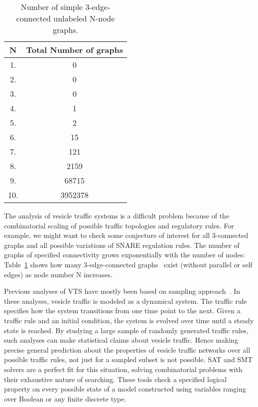 \begin{table}[!ht]
	\centering
	\begin{tabular}{|c|c|}
		\hline 
		\textbf{N} & \textbf{Total Number of graphs} \\ \hline
		1.         & 0                               \\ \hline
		2.         & 0                               \\ \hline
		3.         & 0                               \\ \hline
		4.         & 1                               \\ \hline
		5.         & 2                               \\ \hline
		6.         & 15                              \\ \hline
		7.         & 121                             \\ \hline
		8.         & 2159                            \\ \hline
		9.         & 68715                           \\ \hline
		10.        & 3952378                         \\ \hline
	\end{tabular}
	\label{tab-graphs}
     \caption{Number of simple 3-edge-connected unlabeled N-node graphs.}
\end{table}

The analysis of vesicle traffic systems is a difficult problem
because of the combinatorial scaling of possible traffic topologies and regulatory rules. 
%
For example, we might want to check some conjecture of interest for all 3-connected graphs and
all possible variations of SNARE regulation rules. 
%
The number of graphs of specified connectivity grows exponentially with the number of nodes: Table~\ref{tab-graphs} shows how many 3-edge-connected graphs~\cite{a052448-oeis} exist (without parallel or self edges) as node number N increases.
%

Previous analyses of VTS have mostly been based on sampling approach~\cite{mani2016wine, mani2016stacking}. 
%
In these analyses, vesicle traffic is
modeled as a dynamical system. 
%
The traffic rule specifies how the system transitions from one
time point to the next. 
%
Given a traffic rule and an initial condition, the system is evolved over time until a steady state is reached. By studying a large sample of randomly generated traffic
rules, such analyses can make statistical claims about vesicle traffic.
%
Hence making precise general prediction about the properties of vesicle traffic networks over all possible traffic rules, not just for a sampled subset is not possible.
%
SAT and SMT solvers are a perfect fit for this situation, solving combinatorial problems with their exhaustive nature of searching. 
%
These tools check a specified logical property
on every possible state of a model constructed using variables ranging over Boolean or any
finite discrete type.

